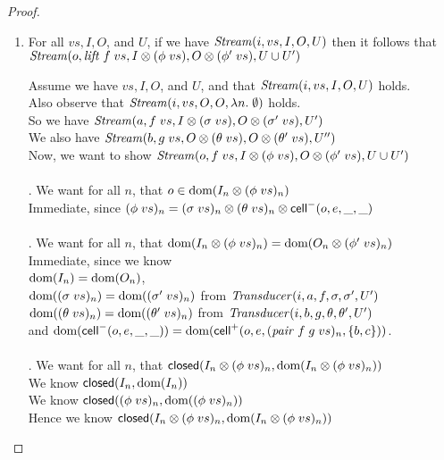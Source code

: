 \begin{proof}
\begin{enumerate}
\item For all $vs, I, O$, and $U$, if we have $\mathit{Stream}(i, vs, I, O, U)$ then it follows that $\mathit{Stream}(o, \mathit{lift}\;f\;vs, I \otimes (\phi\;vs), O \otimes (\phi'\;vs), U \cup U')$
  \begin{tabbedproof}
  \oo Assume we have $vs, I, O$, and $U$, and that $\mathit{Stream}(i, vs, I, O, U)$ holds. \\
  \oo Also observe that $\mathit{Stream}(i, vs, O, O, \lambda n.\;\emptyset)$ holds. \\
  \oo So we have $\mathit{Stream}(a, f\;vs, I \otimes (\sigma\;vs), O \otimes (\sigma'\;vs), U')$ \\
  \oo We also have $\mathit{Stream}(b, g\;vs, O \otimes (\theta\;vs), O \otimes (\theta'\;vs), U'')$ \\
  \oo Now, we want to show $\mathit{Stream}(o, f\;vs, I \otimes (\phi\;vs), O \otimes (\phi'\;vs), U \cup U')$ \\
  \\ . We want for all $n$, that $o \in \mbox{dom}({I_n \otimes (\phi\;vs)_n})$ \\
  \ooo Immediate, since $(\phi\;vs)_n = (\sigma\;vs)_n \otimes (\theta\;vs)_n \otimes \mathsf{cell}^{-}({o}, {e}, {\_}, {\_})$ \\

  \\ . We want for all $n$, that $\mbox{dom}({I_n \otimes (\phi\;vs)_n}) = \mbox{dom}({O_n \otimes (\phi'\;vs)_n})$ \\
  \ooo Immediate, since we know \\ 
  \ooox $\mbox{dom}({I_n}) = \mbox{dom}({O_n})$, \\
  \ooox $\mbox{dom}({(\sigma\;vs)_n}) = \mbox{dom}({(\sigma'\;vs)_n})$ from $\mathit{Transducer}(i, a, f, \sigma, \sigma', U')$ \\
  \ooox $\mbox{dom}({(\theta\;vs)_n}) = \mbox{dom}({(\theta'\;vs)_n})$ from $\mathit{Transducer}(i, b, g, \theta, \theta', U')$\\
  \ooox and $\mbox{dom}({\mathsf{cell}^{-}({o}, {e}, {\_}, {\_})}) = \mbox{dom}({\mathsf{cell}^{+}({o}, {e}, {(\mathit{pair}\;f\;g\;vs)_n}, {\{{b,c}\}})})$. \\

  \\ . We want for all $n$, that $\mathsf{closed}({I_n \otimes (\phi\;vs)_n}, {\mbox{dom}({I_n \otimes (\phi\;vs)_n})})$\\
  \ooo We know $\mathsf{closed}({I_n}, {\mbox{dom}({I_n})})$ \\
  \ooo We know $\mathsf{closed}({(\phi\;vs)_n}, {\mbox{dom}({(\phi\;vs)_n})})$ \\
  \ooo Hence we know $\mathsf{closed}({I_n \otimes (\phi\;vs)_n}, {\mbox{dom}({I_n \otimes (\phi\;vs)_n})})$ \\


\end{tabbedproof}
\end{enumerate}
\end{proof}
